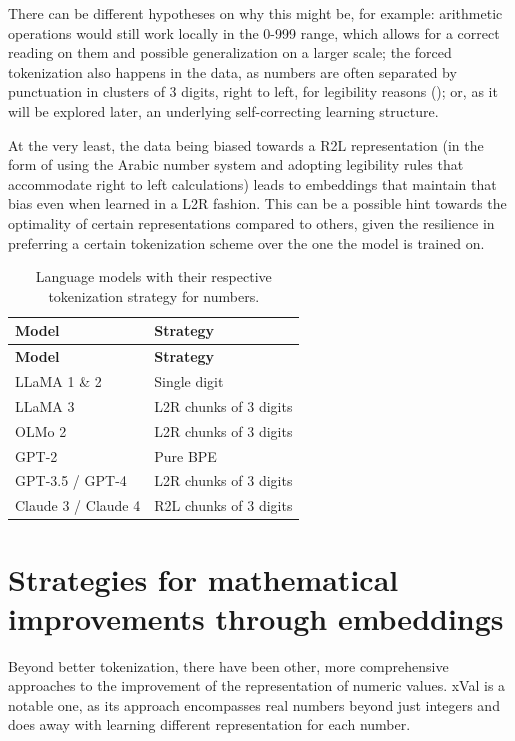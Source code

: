 \documentclass[
  a4paper, twoside, 10pt, titlepage]{book}
\begin{document}
There can be different hypotheses on why this might be, for example:
arithmetic operations would still work locally in the 0-999 range, which
allows for a correct reading on them and possible generalization on a
larger scale; the forced tokenization also happens in the data, as
numbers are often separated by punctuation in clusters of 3 digits,
right to left, for legibility reasons (); or, as it will be explored later, an underlying
self-correcting learning structure.

At the very least, the data being biased towards a R2L representation
(in the form of using the Arabic number system and adopting legibility
rules that accommodate right to left calculations) leads to embeddings
that maintain that bias even when learned in a L2R fashion. This can be
a possible hint towards the optimality of certain representations
compared to others, given the resilience in preferring a certain
tokenization scheme over the one the model is trained on.

\begin{longtable}[]{@{}ll@{}}
\caption{Language models with their respective tokenization strategy for
numbers.}\tabularnewline
\toprule\noalign{}
\textbf{Model} & \textbf{Strategy} \\
\midrule\noalign{}
\endfirsthead
\toprule\noalign{}
\textbf{Model} & \textbf{Strategy} \\
\midrule\noalign{}
\endhead
\bottomrule\noalign{}
\endlastfoot
LLaMA 1 \& 2 & Single digit \\
LLaMA 3 & L2R chunks of 3 digits \\
OLMo 2 & L2R chunks of 3 digits \\
GPT-2 & Pure BPE \\
GPT-3.5 / GPT-4 & L2R chunks of 3 digits \\
Claude 3 / Claude 4 & R2L chunks of 3 digits \\
\end{longtable}

\section{Strategies for mathematical improvements through
embeddings}\label{strategies-for-mathematical-improvements-through-embeddings}

Beyond better tokenization, there have been other, more comprehensive
approaches to the improvement of the representation of numeric values.
xVal is a notable one, as its approach encompasses real numbers beyond
just integers and does away with learning different representation for
each number.
\end{document}
